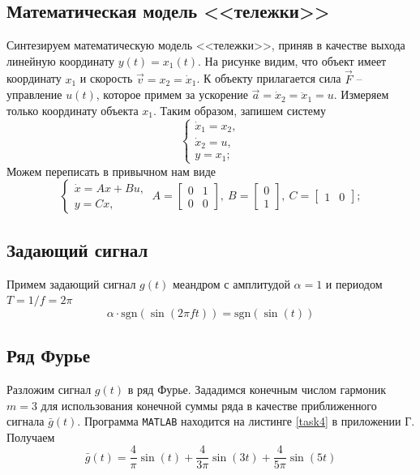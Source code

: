 \documentclass[a4paper, 12pt]{article}
\begin{document}
    \subsection{Математическая модель <<тележки>>}
    Синтезируем математическую модель <<тележки>>,
    приняв в качестве выхода линейную координату
    $y(t)=x_1(t)$. На рисунке видим, что объект
    имеет координату $x_1$ и скорость $\vec{v}=x_2=\dot{x}_1$.
    К объекту прилагается сила $\vec{F}$ -- управление $u(t)$,
    которое примем за ускорение $\vec{a}=\dot{x}_2=\ddot{x}_1=u$.
    Измеряем только координату объекта $x_1$. Таким образом, запишем систему
    $$
    \begin{cases}
        \dot{x}_1=x_2,\\
        \dot{x}_2=u,\\
        y=x_1;
    \end{cases}
    $$
    Можем переписать в привычном нам виде
    $$
    \begin{cases}
        \dot{x}=Ax+Bu,\\
        y=Cx,
    \end{cases}\ A=\begin{bmatrix}
        0 &1\\
        0 &0
    \end{bmatrix},\ B=\begin{bmatrix}
        0\\1
    \end{bmatrix},\ C=\begin{bmatrix}
        1 &0
    \end{bmatrix};
    $$


    \subsection{Задающий сигнал}
    Примем задающий сигнал $g(t)$ меандром
    с амплитудой $\alpha=1$ и периодом $T=1/f=2\pi$
    $$\alpha\cdot\mathrm{sgn}\left( \sin(2\pi f t) \right)=\mathrm{sgn}\left( \sin(t) \right)$$


    \subsection{Ряд Фурье}
    Разложим сигнал $g(t)$ в ряд Фурье. Зададимся конечным
    числом гармоник $m=3$ для использования конечной
    суммы ряда в качестве приближенного сигнала $\bar{g}(t)$.
    Программа \texttt{MATLAB} находится на листинге \ref{task4}
    в приложении Г. Получаем
    $$
    \bar{g}(t)=\dfrac{4}{\pi}\sin(t)+\dfrac{4}{3\pi}\sin(3t)+\dfrac{4}{5\pi}\sin(5t)
    $$
\end{document}

